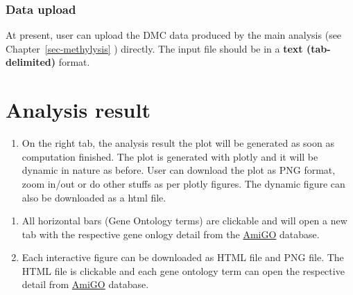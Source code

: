 \documentclass[
  a4paper,
  DIV=11,
  numbers=noendperiod,
  oneside,
  open=any]{scrreport}
\providecommand{\tightlist}{%
  \setlength{\itemsep}{0pt}\setlength{\parskip}{0pt}}\usepackage{longtable,booktabs,array}
\begin{document}
\subsubsection{Data upload}\label{data-upload-4}

At present, user can upload the DMC data produced by the main analysis
(see Chapter~\ref{sec-methylysis} ) directly. The input file should be
in a \textbf{text (tab-delimited)} format.

\section{Analysis result}\label{analysis-result-4}

\begin{enumerate}
\def\labelenumi{\arabic{enumi}.}
\tightlist
\item
  On the right tab, the analysis result the plot will be generated as
  soon as computation finished. The plot is generated with plotly and it
  will be dynamic in nature as before. User can download the plot as PNG
  format, zoom in/out or do other stuffs as per plotly figures. The
  dynamic figure can also be downloaded as a html file.
\end{enumerate}

\begin{tcolorbox}[enhanced jigsaw, opacityback=0, toprule=.15mm, bottomtitle=1mm, colback=white, rightrule=.15mm, breakable, coltitle=black, colbacktitle=quarto-callout-note-color!10!white, toptitle=1mm, arc=.35mm, colframe=quarto-callout-note-color-frame, bottomrule=.15mm, opacitybacktitle=0.6, titlerule=0mm, leftrule=.75mm, title=\textcolor{quarto-callout-note-color}{\faInfo}\hspace{0.5em}{Note}, left=2mm]

\begin{enumerate}
\def\labelenumi{\arabic{enumi}.}
\tightlist
\item
  All horizontal bars (Gene Ontology terms) are clickable and will open
  a new tab with the respective gene onlogy detail from the
  \href{http://amigo.geneontology.org/amigo}{AmiGO} database.
\item
  Each interactive figure can be downloaded as HTML file and PNG file.
  The HTML file is clickable and each gene ontology term can open the
  respective detail from
  \href{http://amigo.geneontology.org/amigo}{AmiGO} database.
\end{enumerate}

\end{tcolorbox}
\end{document}
